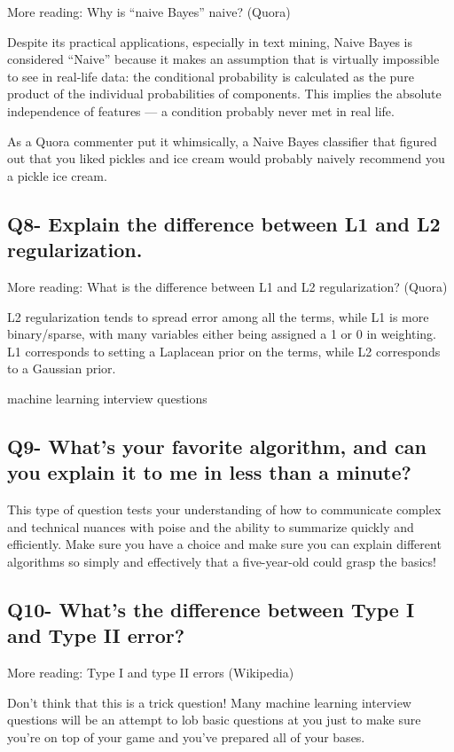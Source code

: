 \documentclass[11pt,a4paper]{article}
\begin{document}
More reading: Why is “naive Bayes” naive? (Quora)

Despite its practical applications, especially in text mining, Naive Bayes is considered “Naive” because it makes an assumption that is virtually impossible to see in real-life data: the conditional probability is calculated as the pure product of the individual probabilities of components. This implies the absolute independence of features — a condition probably never met in real life.

As a Quora commenter put it whimsically, a Naive Bayes classifier that figured out that you liked pickles and ice cream would probably naively recommend you a pickle ice cream.

\subsection{Q8- Explain the difference between L1 and L2 regularization.}

More reading: What is the difference between L1 and L2 regularization? (Quora)

L2 regularization tends to spread error among all the terms, while L1 is more binary/sparse, with many variables either being assigned a 1 or 0 in weighting. L1 corresponds to setting a Laplacean prior on the terms, while L2 corresponds to a Gaussian prior.

machine learning interview questions

\subsection{Q9- What’s your favorite algorithm, and can you explain it to me in less than a minute?}

This type of question tests your understanding of how to communicate complex and technical nuances with poise and the ability to summarize quickly and efficiently. Make sure you have a choice and make sure you can explain different algorithms so simply and effectively that a five-year-old could grasp the basics!

\subsection{Q10- What’s the difference between Type I and Type II error?}

More reading: Type I and type II errors (Wikipedia)

Don’t think that this is a trick question! Many machine learning interview questions will be an attempt to lob basic questions at you just to make sure you’re on top of your game and you’ve prepared all of your bases.
\end{document}
